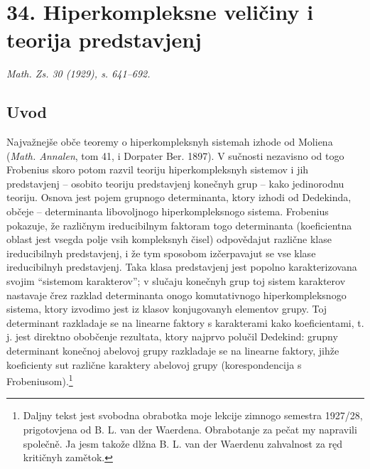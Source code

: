 \documentclass[11pt]{article}
\begin{document}
\setcounter{footnote}{0}

\section*{34. Hiperkompleksne veličiny i teorija predstavjenj}
\emph{Math. Zs. 30 (1929), s. 641--692.}

\subsection*{Uvod}

Najvažnejše obče teoremy o hiperkompleksnyh sistemah izhode od Moliena (\emph{Math. Annalen}, tom 41, i Dorpater Ber. 1897). V sučnosti nezavisno od togo Frobenius skoro potom razvil teoriju hiperkompleksnyh sistemov i jih predstavjenj -- osobito teoriju predstavjenj konečnyh grup -- kako jedinorodnu teoriju. Osnova jest pojem grupnogo determinanta, ktory izhodi od Dedekinda, občeje -- determinanta libovoljnogo hiperkompleksnogo sistema. Frobenius pokazuje, že različnym ireducibilnym faktoram togo determinanta (koeficientna oblast jest vsegda polje vsih kompleksnyh čisel) odpovědajut različne klase ireducibilnyh predstavjenj, i že tym sposobom izčerpavajut se vse klase ireducibilnyh predstavjenj. Taka klasa predstavjenj jest popolno karakterizovana svojim “sistemom karakterov”; v slučaju konečnyh grup toj sistem karakterov nastavaje črez razklad determinanta onogo komutativnogo hiperkompleksnogo sistema, ktory izvodimo jest iz klasov konjugovanyh elementov grupy. Toj determinant razkladaje se na linearne faktory s karakterami kako koeficientami, t. j. jest direktno obobčenje rezultata, ktory najprvo polučil Dedekind: grupny determinant konečnoj abelovoj grupy razkladaje se na linearne faktory, jihže koeficienty sut različne karaktery abelovoj grupy (korespondencija s Frobeniusom).\footnote{Daljny tekst jest svobodna obrabotka moje lekcije zimnogo semestra 1927/28, prigotovjena od B. L. van der Waerdena. Obrabotanje za pečat my napravili společně. Ja jesm takože dlžna B. L. van der Waerdenu zahvalnost za ręd kritičnyh zamětok.}
\end{document}
